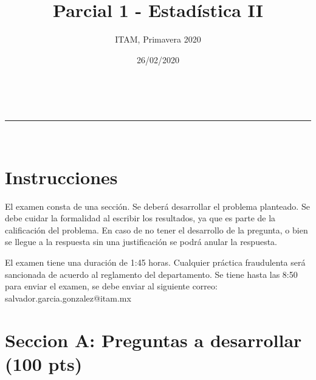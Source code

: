 \documentclass[addpoints]{exam}
\makeatletter
\newcommand{\linia}{\rule{\linewidth}{0.5pt}}
\theoremstyle{mytheor}
\renewcommand{\maketitle}{
    \begin{center}
    \vspace{2ex}
    {\huge \textsc{\@title}}
    \vspace{1ex}
    \\
    \linia\\
    \@author \hfill \@date
    \vspace{4ex}
    \end{center}
  }
\makeatother
\begin{document}
  
  \title{Parcial 1 - Estadística II}
  
  \author{ITAM, Primavera 2020}
  
  \date{26/02/2020}
  
  \maketitle
  
  \section*{Instrucciones}
  

  
  
 El examen consta de una sección. Se deberá desarrollar el problema planteado. Se debe cuidar la formalidad al escribir los resultados, ya que es parte de la calificación del problema. En caso de no tener el desarrollo de la pregunta, o bien se llegue a la respuesta sin una justificación se podrá anular la respuesta. 
  
  \vspace{10pt}
  
El examen tiene una duración de 1:45 horas. Cualquier práctica fraudulenta será sancionada de acuerdo al reglamento del departamento. Se tiene hasta las 8:50 para enviar el examen, se debe enviar al siguiente correo: salvador.garcia.gonzalez@itam.mx


  \section*{Seccion A: Preguntas a desarrollar (100 pts)}
  
\end{document}
